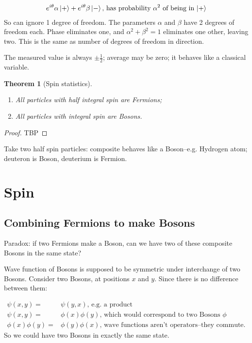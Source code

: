 \documentclass[]{article}
\newtheorem{thm}{Theorem}
\begin{document}
\begin{align*}
	e^{i\theta} \alpha \ket{+} + e^{i\theta}\beta \ket{-} \text{, has probability $\alpha^2$ of being in $\ket{+}$}
\end{align*}
So can ignore 1 degree of freedom. The parameters $\alpha$ and $\beta$ have 2 degrees of freedom each. Phase eliminates one, and $\alpha^2+\beta^2=1$ eliminates one other, leaving two. This is the same as number of degrees of freedom in direction.

The measured value is always $\pm \frac{1}{2}$; average may be zero; it behaves like a classical variable.

\begin{thm}[Spin statistics]
	\begin{enumerate}
		\item All particles with half integral spin are Fermions;
		\item All particles with  integral spin are Bosons.
	\end{enumerate}
\end{thm}

\begin{proof}
	TBP
\end{proof}
Take two half spin particles: composite behaves like a Boson--e.g. Hydrogen atom; deuteron is Boson, deuterium is Fermion.


\section{Spin}

\subsection{Combining Fermions to make Bosons}

Paradox: if two Fermions make a Boson, can we have two of these composite Bosons in the same state?

Wave function of Bosons is supposed to be symmetric under interchange of two Bosons. Consider two Bosons, at positions $x$ and $y$. Since there is no difference between them:

\begin{align*}
	\psi(x,y) =&\psi(y,x) \text{, e.g. a product}\\
	\psi(x,y) =& \phi(x)\phi(y) \text{, which would correspond to two Bosons $\phi$}\\
	\phi(x)\phi(y) =& \phi(y)\phi(x) \text{, wave functions aren't operators--they commute.}
\end{align*}
So we could have two Bosons in exactly the same state.
\end{document}
